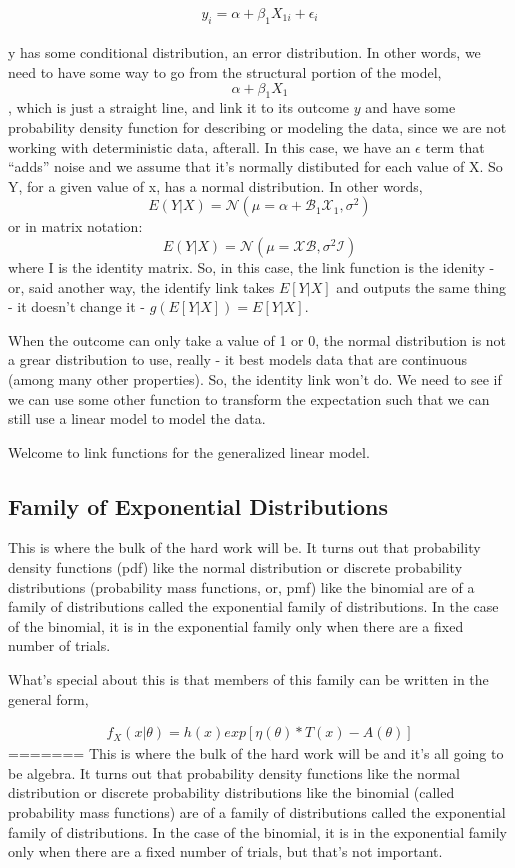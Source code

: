 \documentclass[
]{article}
\begin{document}
\[y_i = \alpha + \beta_1X_{1i }+ \epsilon_i\]\\
y has some conditional distribution, an error distribution. In other
words, we need to have some way to go from the structural portion of the
model, \[\alpha + \beta_1X_1\], which is just a straight line, and link
it to its outcome \(y\) and have some probability density function for
describing or modeling the data, since we are not working with
deterministic data, afterall. In this case, we have an \(\epsilon\) term
that ``adds'' noise and we assume that it's normally distibuted for each
value of X. So Y, for a given value of x, has a normal distribution. In
other words, \[E(Y|X) = \mathcal{N(\mu=\alpha + B_1X_1, \sigma^2)}\] or
in matrix notation:\\
\[E(Y|X) = \mathcal{N(\mu=XB, \sigma^2I)}\] where I is the identity
matrix. So, in this case, the link function is the idenity - or, said
another way, the identify link takes \(E[Y|X]\) and outputs the same
thing - it doesn't change it - \(g(E[Y|X]) = E[Y|X]\).

When the outcome can only take a value of 1 or 0, the normal
distribution is not a grear distribution to use, really - it best models
data that are continuous (among many other properties). So, the identity
link won't do. We need to see if we can use some other function to
transform the expectation such that we can still use a linear model to
model the data.

Welcome to link functions for the generalized linear model.

\hypertarget{family-of-exponential-distributions}{%
\subsection{Family of Exponential
Distributions}\label{family-of-exponential-distributions}}

This is where the bulk of the hard work will be. It turns out that
probability density functions (pdf) like the normal distribution or
discrete probability distributions (probability mass functions, or, pmf)
like the binomial are of a family of distributions called the
exponential family of distributions. In the case of the binomial, it is
in the exponential family only when there are a fixed number of trials.

What's special about this is that members of this family can be written
in the general form,

\begin{align}
\tag{A}
f_X(x|\theta) = h(x)exp[\eta(\theta)*T(x) - A(\theta)]
\end{align}
=======
This is where the bulk of the hard work will be and it's all going to be
algebra. It turns out that probability density functions like the normal
distribution or discrete probability distributions like the binomial
(called probability mass functions) are of a family of distributions
called the exponential family of distributions. In the case of the
binomial, it is in the exponential family only when there are a fixed
number of trials, but that's not important.
\end{document}
